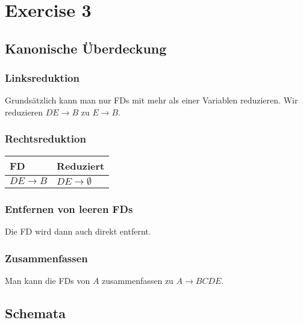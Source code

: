 \documentclass[10pt,a4paper]{article}
\begin{document}
\section*{Exercise 3}

\subsection*{Kanonische Überdeckung}

\subsubsection*{Linksreduktion}

Grundsätzlich kann man nur FDs mit mehr als einer Variablen reduzieren.
Wir reduzieren $DE \rightarrow B$ zu $E \rightarrow B$.

\subsubsection*{Rechtsreduktion}

\begin{tabular}{ll}
FD & Reduziert\\
\hline
$DE \rightarrow B$ & $DE \rightarrow \emptyset$\\
\end{tabular}
\begin{comment}
#+ORGTBL: SEND exercise-3-reductions orgtbl-to-latex :splice nil :skip 0 :raw t
| FD                 | Reduziert                  |
|--------------------+----------------------------|
| $DE \rightarrow B$ | $DE \rightarrow \emptyset$ |
\end{comment}

\subsubsection*{Entfernen von leeren FDs}

Die FD wird dann auch direkt entfernt.

\subsubsection*{Zusammenfassen}

Man kann die FDs von $A$ zusammenfassen zu $A \rightarrow BCDE$.

\subsection*{Schemata}
\end{document}
